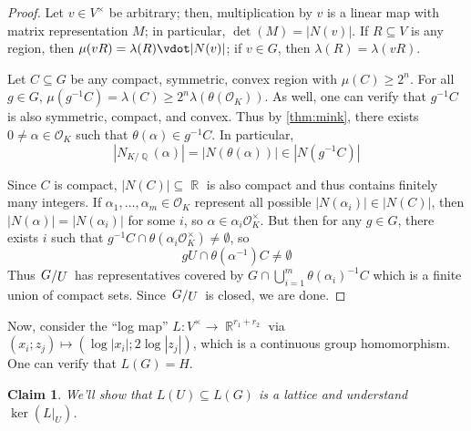 \documentclass[11pt, a4paper]{memoir}
\DeclareMathOperator{\Q}{{\mathbb{Q}}}
\DeclareMathOperator{\R}{{\mathbb{R}}}
\newcommand{\abs}[1]{\ensuremath{\left\lvert#1\right\rvert}}
\theoremstyle{change}
\theoremstyle{plain}
\newtheorem{claim}{Claim}
\theoremstyle{nonumberplain}
\newtheorem{proof}{Proof}
\newcommand{\quot}[2]{\mathchoice{\left.\raisebox{0.13em}{$#1$}\middle/\raisebox{-0.13em}{$#2$}\right.}
                                 {\left.\raisebox{0.07em}{$#1$}\middle/\raisebox{-0.07em}{$#2$}\right.}
                                 {\left.\raisebox{0.03em}{$#1$}\middle/\raisebox{-0.03em}{$#2$}\right.}
                                 {\left.\raisebox{0em}{$#1$}\middle/\raisebox{0em}{$#2$}\right.}}
\numberwithin{equation}{section}
\begin{document}
\begin{proof}
    Let $v\in V^\times$ be arbitrary; then, multiplication by $v$ is a linear map with matrix representation $M$; in particular, $\det(M)=|N(v)|$.
    If $R\subseteq V$ is any region, then $\mu(vR)=\lambda(R)\vdot|N(v)|$; if $v\in G$, then $\lambda(R)=\lambda(vR)$.

    Let $C\subseteq G$ be any compact, symmetric, convex region with $\mu(C)\geq 2^n$.
    For all $g\in G$, $\mu(g^{-1}C)=\lambda(C)\geq 2^n\lambda(\theta(\mathcal{O}_K))$.
    As well, one can verify that $g^{-1}C$ is also symmetric, compact, and convex.
    Thus by \cref{thm:mink}, there exists $0\neq\alpha\in\mathcal{O}_K$ such that $\theta(\alpha)\in g^{-1}C$.
    In particular,
    \begin{equation*}
        \abs{N_{K/\Q}(\alpha)}=\abs{N(\theta(\alpha))}\in\abs{N(g^{-1}C)}
    \end{equation*}

    Since $C$ is compact, $|N(C)|\subseteq\R$ is also compact and thus contains finitely many integers.
    If $\alpha_1,\ldots,\alpha_m\in\mathcal{O}_K$ represent all possible $|N(\alpha_i)|\in|N(C)|$, then $|N(\alpha)|=|N(\alpha_i)|$ for some $i$, so $\alpha\in\alpha_i\mathcal{O}_K^\times$.
    But then for any $g\in G$, there exists $i$ such that $g^{-1}C\cap\theta(\alpha_i\mathcal{O}_K^\times)\neq\emptyset$, so
    \begin{equation*}
        gU\cap\theta(\alpha^{-1})C\neq\emptyset
    \end{equation*}
    Thus $\quot{G}{U}$ has representatives covered by $G\cap\bigcup_{i=1}^m\theta(\alpha_i)^{-1}C$ which is a finite union of compact sets.
    Since $\quot{G}{U}$ is closed, we are done.
\end{proof}
Now, consider the ``log map'' $L:V^\times\to\R^{r_1+r_2}$ via $(x_i;z_j)\mapsto(\log|x_i|;2\log|z_j|)$, which is a continuous group homomorphism.
One can verify that $L(G)=H$.
\begin{claim}
    We'll show that $L(U)\subseteq L(G)$ is a lattice and understand $\ker(L|_U)$.
\end{claim}
\end{document}
